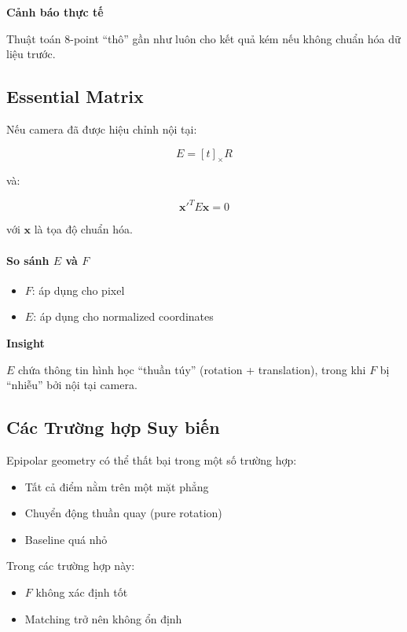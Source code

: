 \begin{mdframed}[style=infobox]
	\textbf{Cảnh báo thực tế}
	
	Thuật toán 8-point “thô” gần như luôn cho kết quả kém nếu không chuẩn hóa dữ liệu trước.
\end{mdframed}

\subsection{Essential Matrix}
\label{subsec:essential_matrix}

Nếu camera đã được hiệu chỉnh nội tại:

\[
E = [t]_\times R
\]

và:

\[
\mathbf{x}'^T E \mathbf{x} = 0
\]

với $\mathbf{x}$ là tọa độ chuẩn hóa.

\paragraph{So sánh $E$ và $F$}

\begin{itemize}
	\item $F$: áp dụng cho pixel
	\item $E$: áp dụng cho normalized coordinates
\end{itemize}

\begin{mdframed}[style=infobox]
	\textbf{Insight}
	
	$E$ chứa thông tin hình học “thuần túy” (rotation + translation), trong khi $F$ bị “nhiễu” bởi nội tại camera.
\end{mdframed}

\subsection{Các Trường hợp Suy biến}
\label{subsec:degeneracy}

Epipolar geometry có thể thất bại trong một số trường hợp:

\begin{itemize}
	\item Tất cả điểm nằm trên một mặt phẳng
	\item Chuyển động thuần quay (pure rotation)
	\item Baseline quá nhỏ
\end{itemize}

Trong các trường hợp này:
\begin{itemize}
	\item $F$ không xác định tốt
	\item Matching trở nên không ổn định
\end{itemize}

